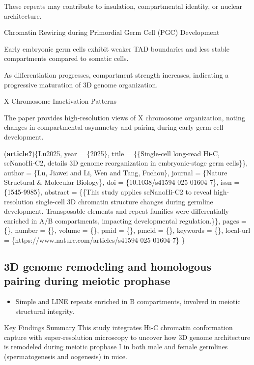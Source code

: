 \documentclass[
  a4paper,
]{scrbook}
\providecommand{\tightlist}{%
  \setlength{\itemsep}{0pt}\setlength{\parskip}{0pt}}
\begin{document}
These repeats may contribute to insulation, compartmental identity, or
nuclear architecture.

Chromatin Rewiring during Primordial Germ Cell (PGC) Development

Early embryonic germ cells exhibit weaker TAD boundaries and less stable
compartments compared to somatic cells.

As differentiation progresses, compartment strength increases,
indicating a progressive maturation of 3D genome organization.

X Chromosome Inactivation Patterns

The paper provides high-resolution views of X chromosome organization,
noting changes in compartmental asymmetry and pairing during early germ
cell development.

(\textbf{article?})\{Lu2025, year = \{2025\}, title = \{\{Single-cell
long-read Hi-C, scNanoHi-C2, details 3D genome reorganization in
embryonic-stage germ cells\}\}, author = \{Lu, Jiawei and Li, Wen and
Tang, Fuchou\}, journal = \{Nature Structural \& Molecular Biology\},
doi = \{10.1038/s41594-025-01604-7\}, issn = \{1545-9985\}, abstract =
\{\{This study applies scNanoHi-C2 to reveal high-resolution single-cell
3D chromatin structure changes during germline development. Transposable
elements and repeat families were differentially enriched in A/B
compartments, impacting developmental regulation.\}\}, pages = \{\},
number = \{\}, volume = \{\}, pmid = \{\}, pmcid = \{\}, keywords =
\{\}, local-url = \{https://www.nature.com/articles/s41594-025-01604-7\}
\}

\subsection{3D genome remodeling and homologous pairing during meiotic
prophase}\label{d-genome-remodeling-and-homologous-pairing-during-meiotic-prophase}

\begin{itemize}
\tightlist
\item
  Simple and LINE repeats enriched in B compartments, involved in
  meiotic structural integrity.
\end{itemize}

Key Findings Summary This study integrates Hi-C chromatin conformation
capture with super-resolution microscopy to uncover how 3D genome
architecture is remodeled during meiotic prophase I in both male and
female germlines (spermatogenesis and oogenesis) in mice.
\end{document}
